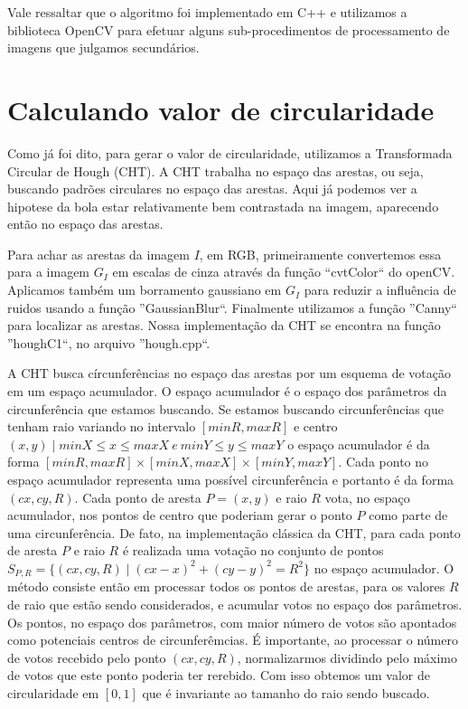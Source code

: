 \documentclass[11pt,a4paper]{article}
\begin{document}
Vale ressaltar que o algoritmo foi implementado em C++ e utilizamos a biblioteca OpenCV para efetuar alguns sub-procedimentos de processamento de imagens que julgamos secundários.

\section{Calculando valor de circularidade}

 Como já foi dito, para gerar o valor de circularidade, utilizamos a Transformada Circular de Hough (CHT). A CHT trabalha no espaço das arestas, ou seja, buscando padrões circulares no espaço das arestas. Aqui já podemos ver a hipotese da bola estar relativamente bem contrastada na imagem, aparecendo então no espaço das arestas.

 Para achar as arestas da imagem $I$, em RGB, primeiramente convertemos essa para a imagem $G_I$ em escalas de cinza através da função ``cvtColor`` do openCV. Aplicamos também um borramento gaussiano em $G_I$ para reduzir a influência de ruidos usando a função ''GaussianBlur``. Finalmente utilizamos a função ''Canny`` para localizar as arestas. Nossa implementação da CHT se encontra na função ''houghC1``, no arquivo ''hough.cpp``.

 A CHT busca círcunferências no espaço das arestas por um esquema de votação em um espaço acumulador. O espaço acumulador é o espaço dos parâmetros da circunferência que estamos buscando. Se estamos buscando circunferências que tenham raio variando no intervalo $[minR,maxR]$ e centro $(x,y) \mid minX \leq x \leq maxX ~e~ minY \leq y \leq maxY $ o espaço acumulador é da forma $[minR,maxR]\times[minX,maxX]\times[minY,maxY]$. Cada ponto no espaço acumulador representa uma possível circunferência e portanto é da forma $(cx,cy,R)$. Cada ponto de aresta $P = (x,y)$ e raio $R$ vota, no espaço acumulador, nos pontos de centro que poderiam gerar o ponto $P$ como parte de uma circunferência. De fato, na implementação clássica da CHT, para cada ponto de aresta $P$ e raio $R$ é realizada uma votação no conjunto de pontos $S_{P,R} = \{ (cx,cy,R) \mid (cx - x)^2 + (cy - y)^2 = R^2\}$ no espaço acumulador. O método consiste então em processar todos os pontos de arestas, para os valores $R$ de raio que estão sendo considerados, e acumular votos no espaço dos parâmetros. Os pontos, no espaço dos parâmetros, com maior número de votos são apontados como potenciais centros de circunferêmcias. É importante, ao processar o número de votos recebido pelo ponto $(cx,cy,R)$, normalizarmos dividindo pelo máximo de votos que este ponto poderia ter rerebido. Com isso obtemos um valor de circularidade em $[0,1]$ que é invariante ao tamanho do raio sendo buscado.
\end{document}

